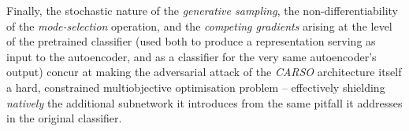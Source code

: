 Finally, the stochastic nature of the \textit{generative sampling}, the non-differentiability of the \textit{mode-selection} operation, and the \textit{competing gradients} arising at the level of the pretrained classifier (used both to produce a representation serving as input to the autoencoder, and as a classifier for the very same autoencoder’s output) concur at making the adversarial attack of the \textit{CARSO} architecture itself a hard, constrained multiobjective optimisation problem – effectively shielding \textit{natively} the additional subnetwork it introduces from the same pitfall it addresses in the original classifier.